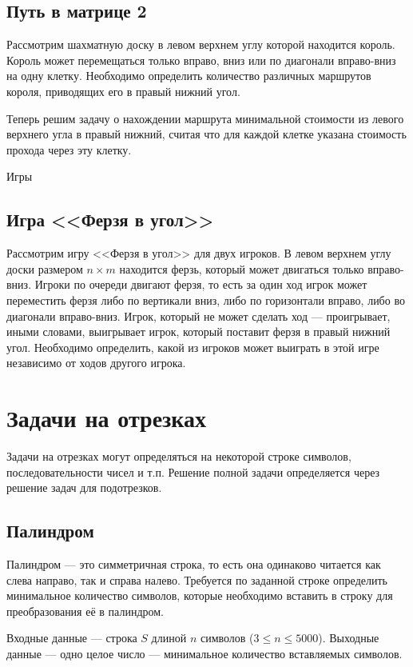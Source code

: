 \documentclass[14pt,openany]{book}
\begin{document}
\section{Путь в матрице 2}

Рассмотрим шахматную доску в левом верхнем углу которой находится король. Король может перемещаться только вправо, вниз или по диагонали вправо-вниз на одну клетку. Необходимо определить количество различных маршрутов короля, приводящих его в правый нижний угол.

Теперь решим задачу о нахождении маршрута минимальной стоимости из левого верхнего угла в правый нижний, считая что для каждой клетке указана стоимость прохода через эту клетку.

Игры

\section{Игра <<Ферзя в угол>>}

Рассмотрим игру <<Ферзя в угол>> для двух игроков. В левом верхнем углу доски размером $n \times m$ 
находится ферзь, который может двигаться только вправо-вниз. Игроки по очереди двигают ферзя, то есть 
за один ход игрок может переместить ферзя либо по вертикали вниз, либо по горизонтали вправо, либо во 
диагонали вправо-вниз. Игрок, который не может сделать ход — проигрывает, иными словами, выигрывает 
игрок, который поставит ферзя в правый нижний угол. Необходимо определить, какой из игроков может 
выиграть в этой игре независимо от ходов другого игрока.


\chapter{Задачи на отрезках}

Задачи на отрезках могут определяться на некоторой строке символов, последовательности чисел
и т.п. Решение полной задачи определяется через решение задач для подотрезков.

\section{Палиндром}

Палиндром --- это симметричная строка, то есть она одинаково читается как слева направо,
так и справа налево. Требуется по заданной строке определить минимальное количество
символов,
которые необходимо вставить в строку для преобразования её в палиндром.

Входные данные --- строка $S$ длиной $n$ символов ($3 \le n \le 5000$).
Выходные данные --- одно целое число --- минимальное количество вставляемых символов.
\end{document}
